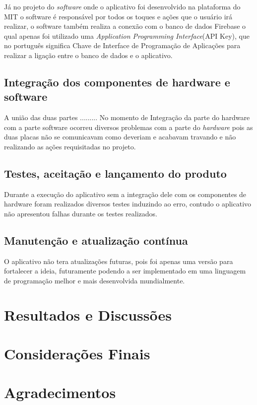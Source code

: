 \documentclass[12pt]{article}
\begin{document}
Já no projeto do \textit{software} onde o aplicativo foi desenvolvido na plataforma do MIT o software é responsável por todos os toques e ações que o usuário irá realizar, o software também realiza a conexão com o banco de dados Firebase o qual apenas foi utilizado uma \textit{Application Programming Interface}(API Key), que no português significa Chave de Interface de Programação de Aplicações para realizar a ligação entre o banco de dados e o aplicativo.


%
%

\subsection{Integração dos componentes de hardware e software}

%
%
A união das duas partes .........
No momento de Integração da parte do hardware com a parte software ocorreu diversos problemas com a parte do \textit{hardware} pois as duas placas não se comunicavam como deveriam e acabavam travando e não realizando as ações requisitadas no projeto.


\subsection{Testes, aceitação e lançamento do produto}
Durante a execução do aplicativo sem a integração dele com os componentes de hardware foram realizados diversos testes induzindo ao erro, contudo o aplicativo não apresentou falhas durante os testes realizados.

%
%

\subsection{Manutenção e atualização contínua}
%
%

O aplicativo não tera atualizações futuras, pois foi apenas uma versão para fortalecer a ideia, futuramente podendo a ser implementado em uma linguagem de programação melhor e mais desenvolvida mundialmente.






\section{Resultados e Discussões}

\section{Considerações Finais}

\section{Agradecimentos}




\end{document}
